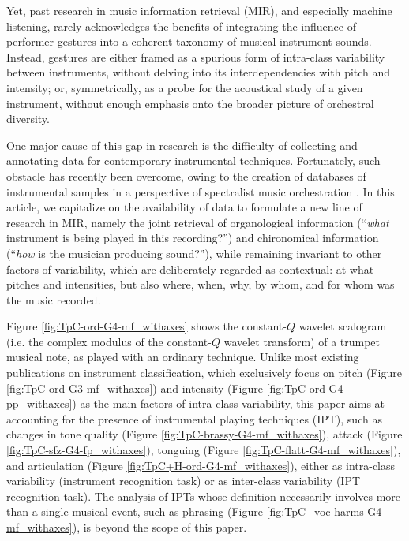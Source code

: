 \documentclass{article}
\makeatletter
\newcommand*{\ie}{i.e.\@\xspace}
\makeatother
\begin{document}
Yet, past research in music information retrieval (MIR), and especially machine listening, rarely acknowledges the benefits of integrating the influence of performer gestures into a coherent taxonomy of musical instrument sounds.
Instead, gestures are either framed as a spurious form of intra-class variability between instruments, without delving into its interdependencies with pitch and intensity;
or, symmetrically, as a probe for the acoustical study of a given instrument, without enough emphasis onto the broader picture of orchestral diversity.

One major cause of this gap in research is the difficulty of collecting and annotating data for contemporary instrumental techniques.
Fortunately, such obstacle has recently been overcome, owing to the creation of databases of instrumental samples in a perspective of spectralist music orchestration \cite{maresz2013cmr}.
In this article, we capitalize on the availability of data to formulate a new line of research in MIR, namely the joint retrieval of organological information (``\emph{what} instrument is being played in this recording?'') and chironomical information (``\emph{how} is the musician producing sound?''), while remaining invariant to other factors of variability, which are deliberately regarded as contextual: at what pitches and intensities, but also where, when, why, by whom, and for whom was the music recorded.

Figure \ref{fig:TpC-ord-G4-mf_withaxes} shows the constant-$Q$ wavelet scalogram (\ie{} the complex modulus of the constant-$Q$ wavelet transform) of a trumpet musical note, as played with an ordinary technique.
Unlike most existing publications on instrument classification, which exclusively focus on pitch (Figure \ref{fig:TpC-ord-G3-mf_withaxes}) and intensity (Figure \ref{fig:TpC-ord-G4-pp_withaxes}) as the main factors of intra-class variability, this paper aims at accounting for the presence of instrumental playing techniques (IPT), such as changes in tone quality (Figure \ref{fig:TpC-brassy-G4-mf_withaxes}), attack (Figure \ref{fig:TpC-sfz-G4-fp_withaxes}), tonguing (Figure \ref{fig:TpC-flatt-G4-mf_withaxes}), and articulation (Figure \ref{fig:TpC+H-ord-G4-mf_withaxes}), either as intra-class variability (instrument recognition task) or as inter-class variability (IPT recognition task).
The analysis of IPTs whose definition necessarily involves more than a single musical event, such as phrasing (Figure \ref{fig:TpC+voc-harms-G4-mf_withaxes}), is beyond the scope of this paper.
\end{document}
